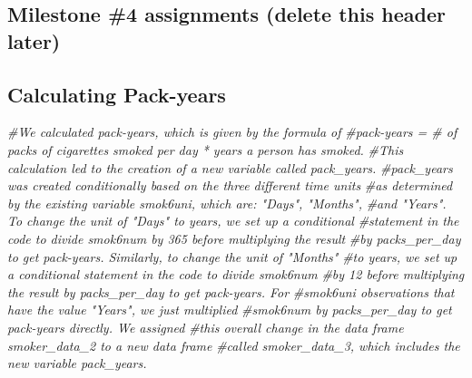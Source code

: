 \documentclass[
]{article}
\newenvironment{Shaded}{\begin{snugshade}}{\end{snugshade}}
\newcommand{\CommentTok}[1]{\textcolor[rgb]{0.56,0.35,0.01}{\textit{#1}}}
\begin{document}
\newpage

\hypertarget{milestone-4-assignments-delete-this-header-later}{%
\subsection{Milestone \#4 assignments (delete this header
later)}\label{milestone-4-assignments-delete-this-header-later}}

\hypertarget{calculating-pack-years}{%
\subsection{Calculating Pack-years}\label{calculating-pack-years}}

\begin{Shaded}
\begin{Highlighting}[]
\CommentTok{\#We calculated pack{-}years, which is given by the formula of}
\CommentTok{\#pack{-}years = \# of packs of cigarettes smoked per day * years a person has smoked.}
\CommentTok{\#This calculation led to the creation of a new variable called \textasciigrave{}pack\_years\textasciigrave{}.}
\CommentTok{\#\textasciigrave{}pack\_years\textasciigrave{} was created conditionally based on the three different time units}
\CommentTok{\#as determined by the existing variable \textasciigrave{}smok6uni\textasciigrave{}, which are: "Days", "Months",}
\CommentTok{\#and "Years". To change the unit of "Days" to years, we set up a conditional}
\CommentTok{\#statement in the code to divide \textasciigrave{}smok6num\textasciigrave{} by 365 before multiplying the result}
\CommentTok{\#by \textasciigrave{}packs\_per\_day\textasciigrave{} to get pack{-}years. Similarly, to change the unit of "Months"}
\CommentTok{\#to years, we set up a conditional statement in the code to divide \textasciigrave{}smok6num\textasciigrave{}}
\CommentTok{\#by 12 before multiplying the result by \textasciigrave{}packs\_per\_day\textasciigrave{} to get pack{-}years. For}
\CommentTok{\#\textasciigrave{}smok6uni\textasciigrave{} observations that have the value "Years", we just multiplied}
\CommentTok{\#\textasciigrave{}smok6num\textasciigrave{} by \textasciigrave{}packs\_per\_day\textasciigrave{} to get pack{-}years directly. We assigned}
\CommentTok{\#this overall change in the data frame smoker\_data\_2 to a new data frame}
\CommentTok{\#called smoker\_data\_3, which includes the new variable \textasciigrave{}pack\_years\textasciigrave{}.}


\end{Highlighting}
\end{Shaded}
\end{document}
